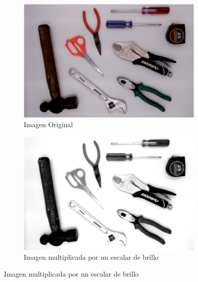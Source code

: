 \documentclass[a4paper, 11pt]{article}
\begin{document}
\begin{figure}[h]
  \centering
  \begin{subfigure}{0.5\linewidth}
    \includegraphics[width=\linewidth]{paso1} 
    \caption{Imagen Original}
    \label{fig:1a}
  \end{subfigure}\hfill
  \begin{subfigure}{0.5\linewidth}
    \includegraphics[width=\linewidth]{paso2}
    \caption{Imagen multiplicada por un escalar de brillo}
    \label{fig:1a}
  \end{subfigure}
  

\end{figure}
\end{document}
